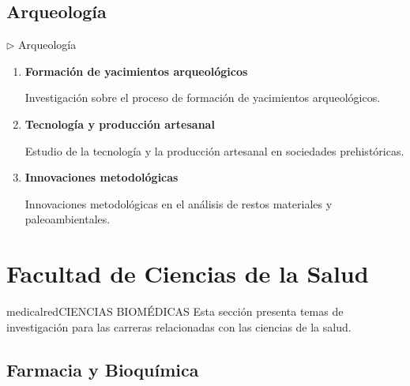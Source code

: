 \documentclass[12pt,a4paper]{article}
\begin{document}
\subsection{Arqueología}

\begin{careerbox}{$\triangleright$ Arqueología}
	\begin{enumerate}
		\item \textbf{Formación de yacimientos arqueológicos}
		
		Investigación sobre el proceso de formación de yacimientos arqueológicos.
		
		\item \textbf{Tecnología y producción artesanal}
		
		Estudio de la tecnología y la producción artesanal en sociedades prehistóricas.
		
		\item \textbf{Innovaciones metodológicas}
		
		Innovaciones metodológicas en el análisis de restos materiales y paleoambientales.
	\end{enumerate}
\end{careerbox}


\section{Facultad de Ciencias de la Salud}

\begin{facultybox}{medicalred}{CIENCIAS BIOMÉDICAS}
Esta sección presenta temas de investigación para las carreras relacionadas con las ciencias de la salud.
\end{facultybox}

\subsection{Farmacia y Bioquímica}
\end{document}
